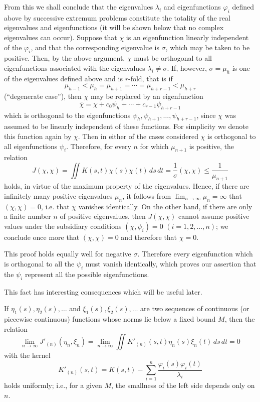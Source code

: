 From this we shall conclude that the eigenvalues $\lambda_i$ and eigenfunctions $\varphi_i$ defined above by successive extremum problems constitute the totality of the real eigenvalues and eigenfunctions (it will be shown below that no complex eigenvalues can occur). Suppose that $\chi$ is an eigenfunction linearly independent of the $\varphi_i$, and that the corresponding eigenvalue is $\sigma$, which may be taken to be positive. Then, by the above argument, $\chi$ must be orthogonal to all eigenfunctions associated with the eigenvalues $\lambda_i\ne\sigma$. If, however, $\sigma=\mu_h$ is one of the eigenvalues defined above and is $r$-fold, that is if
\[
\mu_{h-1}<\mu_h=\mu_{h+1}=\cdots=\mu_{h+r-1}<\mu_{h+r}
\]
(``degenerate case''), then $\chi$ may be replaced by an eigenfunction
\[
\bar\chi=\chi+c_0\psi_h+\cdots+c_{r-1}\psi_{h+r-1}
\]
which is orthogonal to the eigenfunctions $\psi_h,\psi_{h+1},\ldots,\psi_{h+r-1}$, since $\chi$ was assumed to be linearly independent of these functions. For simplicity we denote this function again by $\chi$. Then in either of the cases considered $\chi$ is orthogonal to all eigenfunctions $\psi_i$. Therefore, for every $n$ for which $\mu_{n+1}$ is positive, the relation
\[
J(\chi,\chi)=\iint K(s,t)\chi(s)\chi(t)\,ds\,dt
=\frac{1}{\sigma}(\chi,\chi)\le\frac{1}{\mu_{n+1}}
\]
holds, in virtue of the maximum property of the eigenvalues. Hence, if there are infinitely many positive eigenvalues $\mu_n$, it follows from $\lim_{n\to\infty}\mu_n=\infty$ that $(\chi,\chi)=0$, i.e. that $\chi$ vanishes identically. On the other hand, if there are only a finite number $n$ of positive eigenvalues, then $J(\chi,\chi)$ cannot assume positive values under the subsidiary conditions $(\chi,\psi_i)=0$ $(i=1,2,\ldots,n)$; we conclude once more that $(\chi,\chi)=0$ and therefore that $\chi=0$.

This proof holds equally well for negative $\sigma$. Therefore every eigenfunction which is orthogonal to all the $\psi_i$ must vanish identically, which proves our assertion that the $\psi_i$ represent all the possible eigenfunctions.

This fact has interesting consequences which will be useful later.

If $\eta_1(s),\eta_2(s),\ldots$ and $\xi_1(s),\xi_2(s),\ldots$ are two sequences of continuous (or piecewise continuous) functions whose norms lie below a fixed bound $M$, then the relation
\begin{equation}\tag{50}
\lim_{n\to\infty}J'_{(n)}(\eta_n,\xi_n)
=\lim_{n\to\infty}\iint K'_{(n)}(s,t)\eta_n(s)\xi_n(t)\,ds\,dt=0
\end{equation}
with the kernel
\[
K'_{(n)}(s,t)=K(s,t)-\sum_{i=1}^{n}\frac{\varphi_i(s)\varphi_i(t)}{\lambda_i}
\]
holds uniformly; i.e., for a given $M$, the smallness of the left side depends only on $n$.

